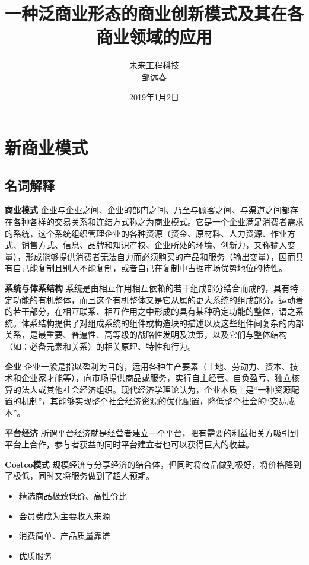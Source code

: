 \documentclass[UTF9]{ctexart}
\title{一种泛商业形态的商业创新模式及其在各商业领域的应用}
\date{2019年1月2日}
\author{未来工程科技\\邹远春}
\begin{document}
\maketitle

\newcommand\Emph{\textbf}

\tableofcontents

\section{新商业模式}

\subsection{名词解释}

\Emph{商业模式}
企业与企业之间、企业的部门之间、乃至与顾客之间、与渠道之间都存在各种各样的交易关系和连结方式称之为商业模式。它是一个企业满足消费者需求的系统，这个系统组织管理企业的各种资源（资金、原材料、人力资源、作业方式、销售方式、信息、品牌和知识产权、企业所处的环境、创新力，又称输入变量），形成能够提供消费者无法自力而必须购买的产品和服务（输出变量），因而具有自己能复制且别人不能复制，或者自己在复制中占据市场优势地位的特性。

\Emph{系统与体系结构}
系统是由相互作用相互依赖的若干组成部分结合而成的，具有特定功能的有机整体，而且这个有机整体又是它从属的更大系统的组成部分。运动着的若干部分，在相互联系、相互作用之中形成的具有某种确定功能的整体，谓之系统。体系结构提供了对组成系统的组件或构造块的描述以及这些组件间复杂的内部关系，是最重要、普遍性、高等级的战略性发明及决策，以及它们与整体结构（如：必备元素和关系）的相关原理、特性和行为。

\Emph{企业}
企业一般是指以盈利为目的，运用各种生产要素（土地、劳动力、资本、技术和企业家才能等），向市场提供商品或服务，实行自主经营、自负盈亏、独立核算的法人或其他社会经济组织。现代经济学理论认为，企业本质上是“一种资源配置的机制”，其能够实现整个社会经济资源的优化配置，降低整个社会的“交易成本”。

\Emph{平台经济}
所谓平台经济就是经营者建立一个平台，把有需要的利益相关方吸引到平台上合作，参与者获益的同时平台建立者也可以获得巨大的收益。

\Emph{Costco模式}
规模经济与分享经济的结合体，但同时将商品做到极好，将价格降到了极低，同时又将服务做到了超人预期。
\begin{itemize}
\item 精选商品极致低价、高性价比
\item 会员费成为主要收入来源
\item 消费简单、产品质量靠谱
\item 优质服务
\end{itemize}
\end{document}
